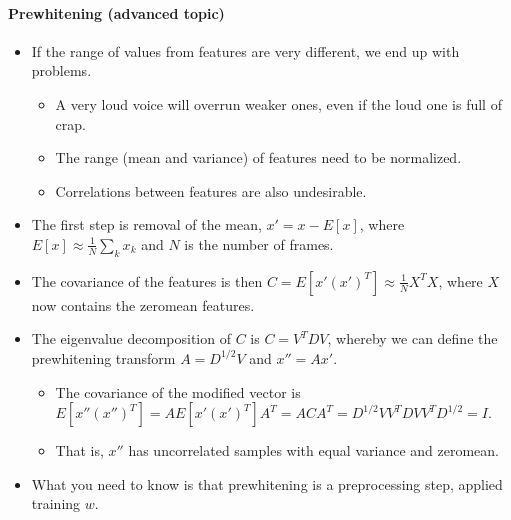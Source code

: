 \documentclass[letterpaper,10pt,english]{jupyterBook}
\begin{document}
\paragraph{Pre\sphinxhyphen{}whitening (advanced topic)}
\label{\detokenize{Recognition/Voice_activity_detection:pre-whitening-advanced-topic}}\begin{itemize}
\item {} 
\sphinxAtStartPar
If the range of values from features are very different, we end up
with problems.
\begin{itemize}
\item {} 
\sphinxAtStartPar
A very loud voice will overrun weaker ones, even if the loud one
is full of crap.

\item {} 
\sphinxAtStartPar
The range (mean and variance) of features need to be normalized.

\item {} 
\sphinxAtStartPar
Correlations between features are also undesirable.

\end{itemize}

\item {} 
\sphinxAtStartPar
The first step is removal of the mean, \(x' = x - E[x]\), where
\(E[x]\approx \frac1N\sum_kx_k\) and \(N\) is the number of frames.

\item {} 
\sphinxAtStartPar
The covariance of the features is then
\(C=E[x'(x')^T]\approx \frac1N X^TX\), where \(X\) now contains the
zero\sphinxhyphen{}mean features.

\item {} 
\sphinxAtStartPar
The eigenvalue decomposition of \(C\) is \(C=V^TDV\), whereby we can
define the pre\sphinxhyphen{}whitening transform \(A=D^{1/2}V\) and \(x'' = Ax'\).
\begin{itemize}
\item {} 
\sphinxAtStartPar
The covariance of the modified vector is
\(E[x''(x'')^T] = AE[x'(x')^T]A^T = A C A^T = D^{1/2}V V^TDV V^T D^{1/2}=I\).

\item {} 
\sphinxAtStartPar
That is, \(x''\) has uncorrelated samples with equal variance and
zero\sphinxhyphen{}mean.

\end{itemize}

\item {} 
\sphinxAtStartPar
What you need to know is that pre\sphinxhyphen{}whitening is a pre\sphinxhyphen{}processing
step, applied  training \(w\).


\end{itemize}
\end{document}
